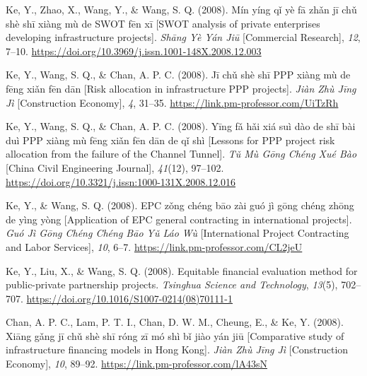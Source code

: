 \documentclass[11pt,a4paper]{report} %
\begin{document}
\begin{tablist}
        \item[2008] \tab{}Ke, Y., Zhao, X., Wang, Y., \& Wang, S. Q. (2008). Mín yíng qǐ yè fā zhǎn jī chǔ shè shī xiàng mù de SWOT fēn xī [SWOT analysis of private enterprises developing infrastructure projects]. \textit{Shāng Yè Yán Jiū} [Commercial Research], \textit{12}, 7--10. \href{https://doi.org/10.3969/j.issn.1001-148X.2008.12.003}{https://doi.org/10.3969/j.issn.1001-148X.2008.12.003}
        
        \item[2008] \tab{}Ke, Y., Wang, S. Q., \& Chan, A. P. C. (2008). Jī chǔ shè shī PPP xiàng mù de fēng xiǎn fēn dān [Risk allocation in infrastructure PPP projects]. \textit{Jiàn Zhù Jīng Jì} [Construction Economy], \textit{4}, 31--35. \href{https://link.pm-professor.com/UiTzRh}{https://link.pm-professor.com/UiTzRh}
        
        \item[2008] \tab{}Ke, Y., Wang, S. Q., \& Chan, A. P. C. (2008). Yīng fǎ hǎi xiá suì dào de shī bài duì PPP xiàng mù fēng xiǎn fēn dān de qǐ shì [Lessons for PPP project risk allocation from the failure of the Channel Tunnel]. \textit{Tǔ Mù Gōng Chéng Xué Bào} [China Civil Engineering Journal], \textit{41}(12), 97--102. \href{https://doi.org/10.3321/j.issn:1000-131X.2008.12.016}{https://doi.org/10.3321/j.issn:1000-131X.2008.12.016}
        
        \item[2008] \tab{}Ke, Y., \& Wang, S. Q. (2008). EPC zǒng chéng bāo zài guó jì gōng chéng zhōng de yìng yòng [Application of EPC general contracting in international projects]. \textit{Guó Jì Gōng Chéng Chéng Bāo Yǔ Láo Wù} [International Project Contracting and Labor Services], \textit{10}, 6--7. \href{https://link.pm-professor.com/CL2jeU}{https://link.pm-professor.com/CL2jeU}
        
        \item[2008] \tab{}Ke, Y., Liu, X., \& Wang, S. Q. (2008). Equitable financial evaluation method for public-private partnership projects. \textit{Tsinghua Science and Technology}, \textit{13}(5), 702--707. \href{https://doi.org/10.1016/S1007-0214(08)70111-1}{https://doi.org/10.1016/S1007-0214(08)70111-1}
        
        \item[2008] \tab{}Chan, A. P. C., Lam, P. T. I., Chan, D. W. M., Cheung, E., \& Ke, Y. (2008). Xiāng gǎng jī chǔ shè shī róng zī mó shì bǐ jiào yán jiū [Comparative study of infrastructure financing models in Hong Kong]. \textit{Jiàn Zhù Jīng Jì} [Construction Economy], \textit{10}, 89--92. \href{https://link.pm-professor.com/lA43sN}{https://link.pm-professor.com/lA43sN}


\end{tablist}
\end{document}
